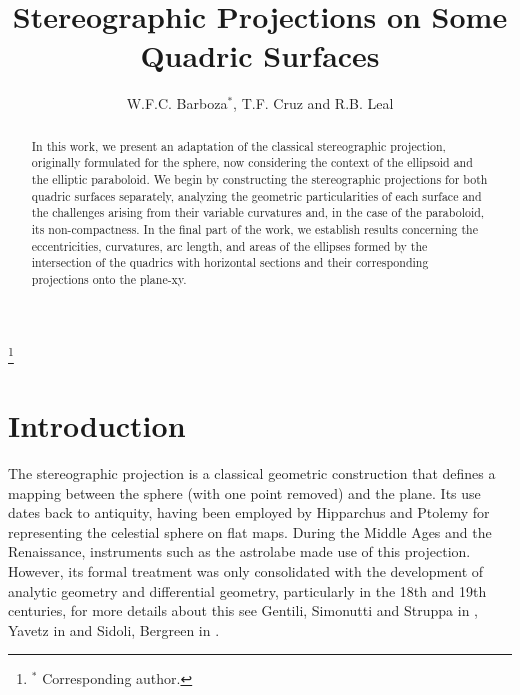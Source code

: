 \documentclass{amsart}
\theoremstyle{plain}
\numberwithin{equation}{section}
\begin{document}
	
	\title[Stereographic Projections on Some Quadric Surfaces]{Stereographic Projections on Some Quadric Surfaces}
	
	\author[W.F.C. Barboza, T.F. Cruz, R.B. Leal]{W.F.C. Barboza$^{\ast}$, T.F. Cruz and R.B. Leal}
	
	\address{$^1$ Unidade Acadêmica de Matem\'atica, Universidade Federal de Campina Grande, 58.429-970 Campina Grande, Para\'iba, Brazil.}
	
	
	
	\thanks{$^\ast$ Corresponding author.}
	
	\begin{abstract}
	In this work, we present an adaptation of the classical stereographic projection, originally formulated for the sphere, now considering the context of the ellipsoid and the elliptic paraboloid. We begin by constructing the stereographic projections for both quadric surfaces separately, analyzing the geometric particularities of each surface and the challenges arising from their variable curvatures and, in the case of the paraboloid, its non-compactness. In the final part of the work, we establish results concerning the eccentricities, curvatures, arc length, and areas of the ellipses formed by the intersection of the quadrics with horizontal sections and their corresponding projections onto the plane-xy.
	\end{abstract}
	
	\maketitle
	
	\section{Introduction}
	
		The stereographic projection is a classical geometric construction that defines a mapping between the sphere (with one point removed) and the plane. Its use dates back to antiquity, having been employed by Hipparchus and Ptolemy for representing the celestial sphere on flat maps. During the Middle Ages and the Renaissance, instruments such as the astrolabe made use of this projection. However, its formal treatment was only consolidated with the development of analytic geometry and differential geometry, particularly in the 18th and 19th centuries, for more details about this see Gentili, Simonutti and Struppa in \cite{gentili}, Yavetz in \cite{yavetz} and Sidoli, Bergreen in \cite{sidoli}.
	
\end{document}
